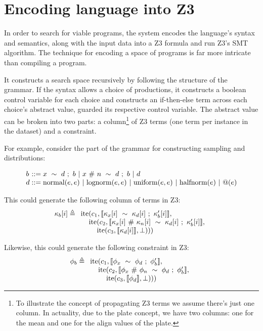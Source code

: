 \documentclass[letterpaper]{llncs}
\begin{document}
\section{Encoding language into Z3}
In order to search for viable programs, the system encodes the language's syntax and semantics, 
along with the input data into a Z3 formula and run Z3's SMT algorithm.
The technique for encoding a space of programs is far more intricate than compiling a program.

It constructs a search space recursively by following the structure of the grammar. 
If the syntax allows a choice of productions, it constructs a boolean control variable for each choice
and constructs an if-then-else term across each choice's abstract value, guarded its respective control variable. 
The abstract value can be broken into two parts: a column\footnote{
To illustrate the concept of propagating Z3 terms we assume there's just one column.
In actuality, due to the plate concept, we have two columns: 
one for the mean and one for the align values of the plate.  
} of Z3 terms (one term per instance in the dataset) and a constraint.

For example, consider the part of the grammar for constructing sampling and distributions:

\[
  \begin{array}{l @{} l}
    b &{} ::= x\ \sim\ d\ ;\ b \ |\ x\ \#\ n\ \sim\ d\ ;\ b \ |\ d \\ 
    d &{} ::= 
        \text{normal}(e, e) \ |\ 
        \text{lognorm}(e, e) \ |\ 
        \text{uniform}(e, e) \ |\ 
        \text{halfnorm}(e) \ |\ 
        @(e) \\ 
  \end{array}
\]


This could generate the following column of terms in Z3:
\[
  \kappa_b[i] \triangleq
  \begin{array}[t]{l}
  \text{ite}(c_1, \llbracket \kappa_x[i]\ \sim\ \kappa_d[i]\ ;\ \kappa_b'[i]  \rrbracket, \\
    \hspace{4mm}\text{ite}(c_2, \llbracket \kappa_x[i]\ \#\ \kappa_n[i]\ \sim\ \kappa_d[i]\ ;\ \kappa_b'[i] \rrbracket, \\
        \hspace{8mm}\text{ite}(c_3, \llbracket \kappa_d[i] \rrbracket, \bot)))
  \end{array}
\]

Likewise, this could generate the following constraint in Z3:
\[
  \phi_b \triangleq
  \begin{array}[t]{l}
  \text{ite}(c_1, \llbracket \phi_x\ \sim\ \phi_d\ ;\ \phi_b'  \rrbracket, \\
    \hspace{4mm}\text{ite}(c_2, \llbracket \phi_x\ \#\ \phi_n\ \sim\ \phi_d\ ;\ \phi_b' \rrbracket, \\
        \hspace{8mm}\text{ite}(c_3, \llbracket \phi_d \rrbracket, \bot)))
  \end{array}
\]
\end{document}
